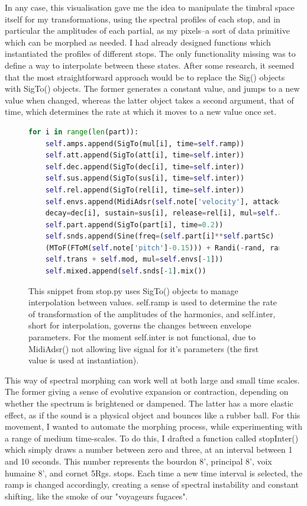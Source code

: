 \documentclass[12pt,twoside,maitrise]{dms_ks}
\theoremstyle{definition}
\begin{document}
{In any case, this visualisation gave me the idea to manipulate the timbral space itself for my transformations, using the spectral profiles of each stop, and in particular the amplitudes of each partial, as my pixels--a sort of data primitive which can be morphed as needed.
I had already designed functions which instantiated the profiles of different stops.
The only functionality missing was to define a way to interpolate between these states.
After some research, it seemed that the most straightforward approach would be to replace the Sig() objects with SigTo() objects.
The former generates a constant value, and jumps to a new value when changed, whereas the latter object takes a second argument, that of time, which determines the rate at which it moves to a new value once set.

\begin{figure}[H]
\begin{lstlisting}[language=Python]
for i in range(len(part)):
    self.amps.append(SigTo(mul[i], time=self.ramp))
    self.att.append(SigTo(att[i], time=self.inter))
    self.dec.append(SigTo(dec[i], time=self.inter))
    self.sus.append(SigTo(sus[i], time=self.inter))
    self.rel.append(SigTo(rel[i], time=self.inter))
    self.envs.append(MidiAdsr(self.note['velocity'], attack=att[i],
    decay=dec[i], sustain=sus[i], release=rel[i], mul=self.amps[-1]))
    self.part.append(SigTo(part[i], time=0.2))
    self.snds.append(Sine(freq=(self.part[i]**self.partSc) * 
    (MToF(FToM(self.note['pitch']-0.15))) + Randi(-rand, rand, 5) + 
    self.trans + self.mod, mul=self.envs[-1]))
    self.mixed.append(self.snds[-1].mix())
\end{lstlisting}
\caption{This snippet from stop.py uses SigTo() objects to manage interpolation between values.
self.ramp is used to determine the rate of transformation of the amplitudes of the harmonics, and self.inter, short for interpolation, governs the changes between envelope parameters.
For the moment self.inter is not functional, due to MidiAdsr() not allowing live signal for it's parameters (the first value is used at instantiation).} 
\end{figure}

This way of spectral morphing can work well at both large and small time scales.
The former giving a sense of evolutive expansion or contraction, depending on whether the spectrum is brightened or dampened.
The latter has a more elastic effect, as if the sound is a physical object and bounces like a rubber ball.
For this movement, I wanted to automate the morphing process, while experimenting with a range of medium time-scales.
To do this, I drafted a function called stopInter() which simply draws a number between zero and three, at an interval between 1 and 10 seconds.
This number represents the bourdon 8', principal 8', voix humaine 8', and cornet 5Rgs.
stops.
Each time a new time interval is selected, the ramp is changed accordingly, creating a sense of spectral instability and constant shifting, like the smoke of our "voyageurs fugaces".

}
\end{document}
